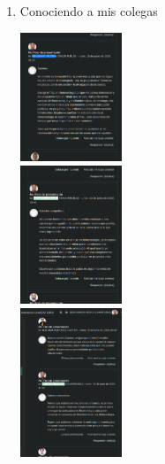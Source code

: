 \documentclass[12pt]{article}
\begin{document}
\begin{enumerate}[{\bf Sesi\'on} 1{.}]
\begin{enumerate}[{\bf Actividad} 1{.}]
				\item {Conociendo a mis colegas}
					\begin{multicols}{3}			
						\includegraphics[width=0.24\textwidth] {CIVUL-U1-S1-A2-1}\\
						\includegraphics[width=0.24\textwidth] {CIVUL-U1-S1-A2-2-1}\\
						\includegraphics[width=0.24\textwidth] {CIVUL-U1-S1-A2-2-2}\\
					\end{multicols}
					

\end{enumerate}
\end{enumerate}
\end{document}
